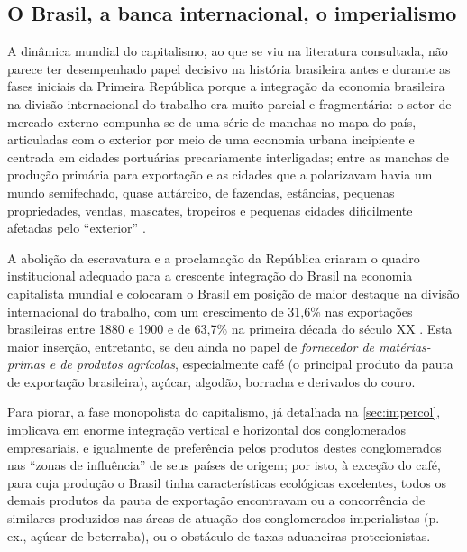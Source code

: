 \subsection{O Brasil, a banca internacional, o imperialismo}\label{subsec:brasimper}

A dinâmica mundial do capitalismo, ao que se viu na literatura consultada, não parece ter desempenhado papel decisivo na história brasileira antes e durante as fases iniciais da Primeira República porque a integração da economia brasileira na divisão internacional do trabalho era muito parcial e fragmentária: o setor de mercado externo compunha-se de uma série de manchas no mapa do país, articuladas com o exterior por meio de uma economia urbana incipiente e centrada em cidades portuárias precariamente interligadas; entre as manchas de produção primária para exportação e as cidades que a polarizavam havia um mundo semifechado, quase autárcico, de fazendas, estâncias, pequenas propriedades, vendas, mascates, tropeiros e pequenas cidades dificilmente afetadas pelo ``exterior'' \cite[p.~35o]{singer_braecomu_1977}.

A abolição da escravatura e a proclamação da República criaram o quadro institucional adequado para a crescente integração do Brasil na economia capitalista mundial e colocaram o Brasil em posição de maior destaque na divisão internacional do trabalho, com um crescimento de 31,6\% nas exportações brasileiras entre 1880 e 1900 e de 63,7\% na primeira década do século XX \cite[p.~352]{singer_braecomu_1977}. Esta maior inserção, entretanto, se deu ainda no papel de \textit{fornecedor de matérias-primas e de produtos agrícolas}, especialmente café (o principal produto da pauta de exportação brasileira), açúcar, algodão, borracha e derivados do couro. 





Para piorar, a fase monopolista do capitalismo, já detalhada na \autoref{sec:impercol}, implicava em enorme integração vertical e horizontal dos conglomerados empresariais, e igualmente de preferência pelos produtos destes conglomerados nas ``zonas de influência'' de seus países de origem; por isto, à exceção do café, para cuja produção o Brasil tinha características ecológicas excelentes, todos os demais produtos da pauta de exportação encontravam ou a concorrência de similares produzidos nas áreas de atuação dos conglomerados imperialistas (p. ex., açúcar de beterraba), ou o obstáculo de taxas aduaneiras protecionistas.

